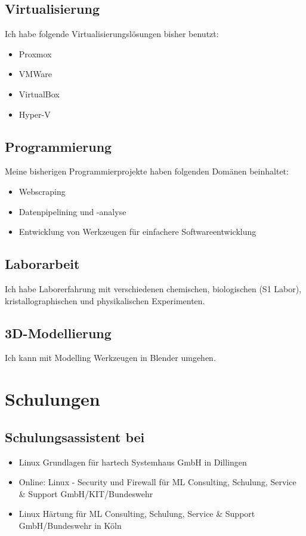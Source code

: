\documentclass{article}
\begin{document}
\subsection{Virtualisierung}
Ich habe folgende Virtualisierungslösungen bisher benutzt:
\begin{itemize}
	\item Proxmox
	\item VMWare
	\item VirtualBox
	\item Hyper-V
\end{itemize}

\subsection{Programmierung}
Meine bisherigen Programmierprojekte haben folgenden Domänen beinhaltet:
\begin{itemize}
	\item Webscraping
	\item Datenpipelining und -analyse
	\item Entwicklung von Werkzeugen für einfachere Softwareentwicklung
\end{itemize}

\subsection{Laborarbeit}
Ich habe Laborerfahrung mit verschiedenen chemischen, biologischen (S1 Labor), kristallographischen und physikalischen Experimenten.

\subsection{3D-Modellierung}
Ich kann mit Modelling Werkzeugen in Blender umgehen.

\section{Schulungen}

\subsection{Schulungsassistent bei}

\begin{itemize}
\item Linux Grundlagen für hartech Systemhaus GmbH in Dillingen
\item Online: Linux - Security und Firewall für ML Consulting, Schulung, Service \& Support GmbH/KIT/Bundeswehr
\item Linux Härtung für ML Consulting, Schulung, Service \& Support GmbH/Bundeswehr in Köln
\end{itemize}
\end{document}
